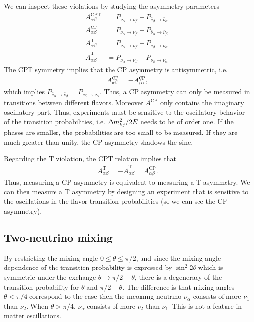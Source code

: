\documentclass[twocolumn]{article}
\newcommand{\n}[1]{\ensuremath{\nu_{#1}}}
\newcommand{\na}{\ensuremath{\nu_\alpha}}
\newcommand{\nb}{\ensuremath{\nu_\beta}}
\newcommand{\ana}{\ensuremath{\bar{\nu}_\alpha}}
\newcommand{\anb}{\ensuremath{\bar{\nu}_\beta}}
\newcommand{\ab}{\ensuremath{\alpha\beta}}
\newcommand*{\dm}[1][]{%
  \Delta m^2\ifx\\#1\\\else_\text{#1}\fi
}
\begin{document}
We can inspect these violations by studying the asymmetry parameters
\begin{align*}
  A^\text{CPT}_{\alpha \beta}     &= P_{\na \to \nb} - P_{\anb \to \ana} \\
  A^\text{CP}_{\alpha \beta}       &= P_{\na \to \nb} - P_{\ana \to \anb} \\
  A^\text{T}_{\alpha \beta}       &= P_{\na \to \nb} - P_{\nb \to \na}   \\
  \bar{A}^\text{T}_{\alpha \beta} &= P_{\ana \to \anb} - P_{\anb \to \ana}
.\end{align*}
The CPT symmetry implies that the CP asymmetry is antisymmetric, i.e.
\begin{align*}
  A^\text{CP}_{\alpha \beta} = - A^\text{CP}_{\beta \alpha}
,\end{align*}
which implies $P_{\ana \to \anb} = P_{\nb \to \na}$. Thus, a CP asymmetry can only be measured in transitions between different flavors. Moreover $A^\text{CP}$ only contains the imaginary oscillatory part. Thus, experiments must be sensitive to the oscillatory behavior of the transition probabilities, i.e. $\dm_{kj} / 2E$ needs to be of order one. If the phases are smaller, the probabilities are too small to be measured. If they are much greater than unity, the CP asymmetry shadows the sine.

Regarding the T violation, the CPT relation implies that 
\begin{align*}
  A^\text{T}_{\ab} = -\bar{A}^\text{T}_{\ab} = A^\text{CP}_{\ab}
.\end{align*}
Thus, measuring a CP asymmetry is equivalent to measuring a T asymmetry. We can then measure a T asymmetry by designing an experiment that is sensitive to the oscillations in the flavor transition probabilities (so we can see the CP asymmetry).

\subsection*{Two-neutrino mixing}
By restricting the mixing angle $0 \le \theta \le \pi / 2$, and since the mixing angle dependence of the transition probability is expressed by $\sin^2 2 \theta$ which is symmetric under the exchange $ \theta \to \pi / 2 - \theta $, there is a degeneracy of the transition probability for $\theta$ and $\pi / 2 - \theta$. The difference is that mixing angles $\theta < \pi / 4$ correspond to the case then the incoming neutrino $\na$ consists of more $\n{1}$ than $\n{2}$. When $\theta > \pi / 4$, $\na$ consists of more $\n{2}$ than $\n{1}$. This is not a feature in matter oscillations.
\end{document}
